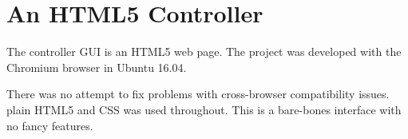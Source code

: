 %
%
%

\chapter{An HTML5 Controller}

The controller GUI is an HTML5 web page.  The project was developed with the 
Chromium browser in Ubuntu 16.04.

There was no attempt to fix problems with cross-browser compatibility issues.  
plain HTML5 and CSS was used throughout.  This is a bare-bones interface with 
no fancy features.


\begin{figure}[h]
	\centering
	\centering\bfseries
	\caption{}
\end{figure}

